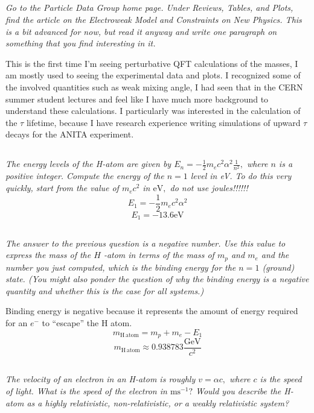 \documentclass[12pt, letterpaper]{article}
\begin{document}
\subsection{}
\textit{Go to the Particle Data Group home page. Under Reviews, Tables, and Plots, find the article on the Electroweak Model and Constraints on New
Physics. This is a bit advanced for now, but read it anyway and write one paragraph on something that you find interesting in it.}

This is the first time I’m seeing perturbative QFT calculations of the masses, I am mostly used to seeing the experimental data and plots. I recognized some of the involved quantities such as weak mixing angle, I had seen that in the CERN summer student lectures and feel like I have much more background to understand these calculations. I particularly was interested in the calculation of the $\tau$ lifetime, because I have research experience writing simulations of upward $\tau$ decays for the ANITA experiment. 

\subsection{}
\textit{The energy levels of the H-atom are given by $E_{n}=-\frac{1}{2} m_{e} c^{2} \alpha^{2} \frac{1}{n^{2}},$ where $n$ is a positive integer. Compute the energy of the $n=1$ level in eV. To do this very quickly, start from the value of $m_{e} c^{2}$ in $\mathrm{eV},$ do not use joules!!!!!!}
$$
E_1=-\frac{1}{2} m_{e} c^{2} \alpha^{2}
$$
$$\boxed{
E_{1}=-13.6 \mathrm{eV}
}
$$

\subsection{}
\textit{The answer to the previous question is a negative number. Use this value to express the mass of the $H$ -atom in terms of the mass of $m_{p}$ and $m_{e}$ and the number you just computed, which is the binding energy for the $n=1$ (ground) state. (You might also ponder the question of why the binding energy is a negative quantity and whether this is the case for all systems.)}

Binding energy is negative because it represents the amount of energy required for an $e^-$ to ``escape'' the H atom.
$$
m_{\mathrm{H \, atom}}=m_{p}+m_{e}-E_{1}
$$
$$\boxed{
m_{\mathrm{H \, atom}}\approx 0.938783 \frac{\mathrm{GeV}}{c^{2}}
}
$$

\subsection{}
\textit{The velocity of an electron in an H-atom is roughly $v=\alpha c,$ where $c$ is the speed of light. What is the speed of the electron in $\mathrm{m} \mathrm{s}^{-1} ?$ Would you describe the H-atom as a highly relativistic, non-relativistic, or a weakly relativistic system?}
\end{document}
